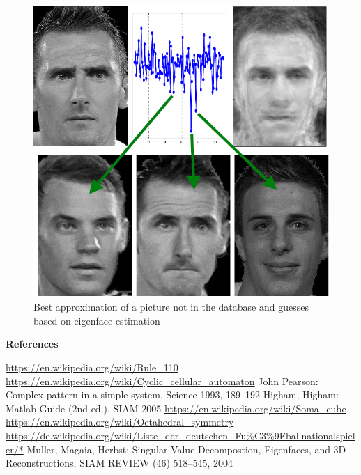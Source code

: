 \documentclass{beamer}
\def\sect#1{\textbf{\color{blue} #1}}
\begin{document}
\begin{frame}[t]{}
\begin{multicols}{5}
\begin{figure}
\includegraphics[height=0.93\hsize]{KloseGuess.png} 
\caption{Best approximation of a picture not in the database and guesses based
         on eigenface estimation
        }
\end{figure}


\medskip

\sect{References}

\begin{thebibliography}{1}
 \url{https://en.wikipedia.org/wiki/Rule_110}
     \url{https://en.wikipedia.org/wiki/Cyclic_cellular_automaton}
 John Pearson: Complex pattern in a simple system, Science 1993, 189--192
 Higham, Higham: Matlab Guide (2nd ed.), SIAM 2005
 \url{https://en.wikipedia.org/wiki/Soma_cube}
 \url{https://en.wikipedia.org/wiki/Octahedral_symmetry}
 \url{https://de.wikipedia.org/wiki/Liste_der_deutschen_Fu\%C3\%9Fballnationalspieler/*}
 Muller, Magaia, Herbst: Singular Value Decompostion, Eigenfaces,
               and 3D Reconstructions, SIAM REVIEW (46) 518--545, 2004
\end{thebibliography}


\end{multicols}
\end{frame}
\end{document}
